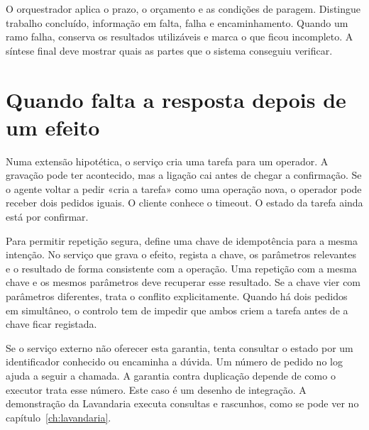 O orquestrador aplica o prazo, o orçamento e as condições de paragem. Distingue trabalho concluído, informação em falta, falha e encaminhamento. Quando um ramo falha, conserva os resultados utilizáveis e marca o que ficou incompleto. A síntese final deve mostrar quais as partes que o sistema conseguiu verificar.

\section{Quando falta a resposta depois de um efeito}

\ficcao Numa extensão hipotética, o serviço cria uma tarefa para um operador. A gravação pode ter acontecido, mas a ligação cai antes de chegar a confirmação. Se o agente voltar a pedir «cria a tarefa» como uma operação nova, o operador pode receber dois pedidos iguais. O cliente conhece o timeout. O estado da tarefa ainda está por confirmar.

Para permitir repetição segura, define uma chave de idempotência para a mesma intenção. No serviço que grava o efeito, regista a chave, os parâmetros relevantes e o resultado de forma consistente com a operação. Uma repetição com a mesma chave e os mesmos parâmetros deve recuperar esse resultado. Se a chave vier com parâmetros diferentes, trata o conflito explicitamente. Quando há dois pedidos em simultâneo, o controlo tem de impedir que ambos criem a tarefa antes de a chave ficar registada.

Se o serviço externo não oferecer esta garantia, tenta consultar o estado por um identificador conhecido ou encaminha a dúvida. Um número de pedido no log ajuda a seguir a chamada. A garantia contra duplicação depende de como o executor trata esse número. Este caso é um desenho de integração. A demonstração da Lavandaria executa consultas e rascunhos, como se pode ver no capítulo~\ref{ch:lavandaria}.
